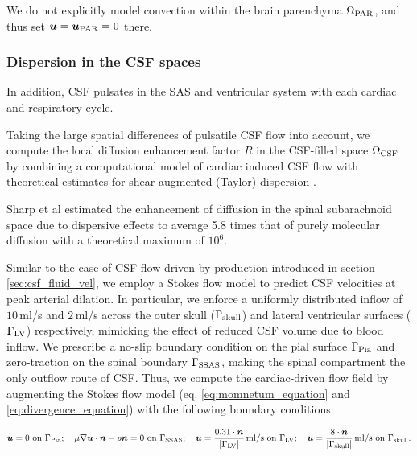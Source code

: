 We do not explicitly model convection within the brain parenchyma $\Omega_{\rm PAR}$, and thus set ${\bm u} = {\bm u}_{\rm PAR} = 0$ there. 

\subsubsection*{Dispersion in the CSF spaces}

In addition, CSF pulsates in the SAS and ventricular system with each
cardiac and respiratory cycle.


Taking the large spatial differences of pulsatile CSF flow into account, we compute the local diffusion enhancement factor $R$ in the CSF-filled space $\Omega_{\rm CSF}$ by combining a computational model of cardiac induced CSF flow with theoretical estimates for shear-augmented (Taylor) dispersion \cite{taylor1953dispersion, watson1983diffusion}.

Sharp et al \cite{keith2019dispersion} estimated the enhancement of diffusion in the spinal subarachnoid space due to dispersive effects to average 5.8 times that of purely molecular diffusion with a theoretical maximum of $10^6$. 

Similar to the case of CSF flow driven by production introduced in section \ref{sec:csf_fluid_vel}, we employ a Stokes flow model to predict CSF velocities at peak arterial dilation. In particular, we enforce a uniformly distributed inflow of $10$\,ml/s and $2$\,ml/s across the outer skull ($\Gamma_{\rm skull}$) and lateral ventricular surfaces ($\Gamma_{\rm LV}$) respectively, mimicking the effect of reduced CSF volume due to blood inflow. We prescribe a no-slip boundary condition on the pial surface $\Gamma_{\rm Pia}$ and zero-traction on the spinal boundary $\Gamma_{\rm SSAS}$, making the spinal compartment the only outflow route of CSF. Thus, we compute the cardiac-driven flow field by augmenting the Stokes flow model (eq. \ref{eq:momnetum_equation} and \ref{eq:divergence_equation}) with the following boundary conditions:

\begin{equation}\label{eq:cardiac_flow_bcs}
    \bm u = 0 \text{ on } \Gamma_{\rm Pia}; \quad 
    \mu \nabla \bm u \cdot \bm n - p \bm n = 0 \text{ on } \Gamma_{\rm SSAS}; \quad 
    \bm u = \frac{0.31 \cdot \bm n}{|\Gamma_{\rm LV}|} \,\text{ml/s} \text{ on } \Gamma_{\rm LV}; \quad
    \bm u = \frac{8 \cdot \bm n}{|\Gamma_{\rm skull}|} \,\text{ml/s} \text{ on } \Gamma_{\rm skull}.
\end{equation}

